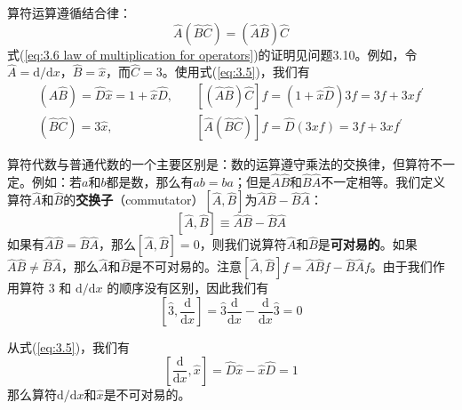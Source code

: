 	算符运算遵循结合律：
	\begin{equation}
		\hat{A}\left(\hat{B}\hat{C}\right) = \left(\hat{A}\hat{B}\right)\hat{C}
		\label{eq:3.6 law of multiplication for operators}
	\end{equation}
	式(\ref{eq:3.6 law of multiplication for operators})的证明见问题3.10。例如，令$\hat{A} = \mathrm{d}/\mathrm{d}x$，$\hat{B} = \hat{x}$，而$\hat{C} = 3$。使用式(\ref{eq:3.5})，我们有
	\begin{equation*}
		\begin{aligned}
			\left(\hat{A}\hat{B}\right) = \hat{D}\hat{x} = 1+ \hat{x}\hat{D}, \quad & \left[\left(\hat{A}\hat{B}\right)\hat{C}\right]f = \left(1+\hat{x}\hat{D}\right)3f = 3f+3xf^{\prime}\\
			\left(\hat{B}\hat{C}\right) = 3\hat{x},  \qquad \quad \qquad & \left[\hat{A}\left(\hat{B}\hat{C}\right)\right]f = \hat{D}\left(3xf\right) = 3f+3xf^{\prime}
		\end{aligned}
	\end{equation*}

	算符代数与普通代数的一个主要区别是：数的运算遵守乘法的交换律，但算符不一定。例如：若$a$和$b$都是数，那么有$ab=ba$；但是$\hat{A}\hat{B}$和$\hat{B}\hat{A}$不一定相等。我们定义算符$\hat{A}$和$\hat{B}$的\textbf{交换子}（commutator）$\left[\hat{A},\hat{B}\right]$为$\hat{A}\hat{B}-\hat{B}\hat{A}$：
	\begin{equation}
		\boxed{
			\left[\hat{A},\hat{B}\right] \equiv \hat{A}\hat{B} - \hat{B}\hat{A}
		}
		\label{eq:3.7 definition of commutator for two operators}
	\end{equation}
	如果有$\hat{A}\hat{B} = \hat{B}\hat{A}$，那么$\left[\hat{A},\hat{B}\right] = 0$，则我们说算符$\hat{A}$和$\hat{B}$是\textbf{可对易的}。如果$\hat{A}\hat{B} \neq \hat{B}\hat{A}$，那么$\hat{A}$和$\hat{B}$是不可对易的。注意$\left[\hat{A}, \hat{B}\right]f = \hat{A}\hat{B}f - \hat{B}\hat{A}f$。由于我们作用算符 3 和 $\mathrm{d}/\mathrm{d}x$ 的顺序没有区别，因此我们有
	\begin{equation*}
		\left[\hat{3},\frac{\mathrm{d}}{\mathrm{d}x}\right] = \hat{3}\frac{\mathrm{d}}{\mathrm{d}x} - \frac{\mathrm{d}}{\mathrm{d}x}\hat{3} = 0
	\end{equation*}

	从式(\ref{eq:3.5})，我们有
	\begin{equation}
		\left[\frac{\mathrm{d}}{\mathrm{d}x}, \hat{x}\right] = \hat{D}\hat{x}-\hat{x}\hat{D} = 1
		\label{eq:3.8}
	\end{equation}
	那么算符$\mathrm{d}/\mathrm{d}x$和$\hat{x}$是不可对易的。

